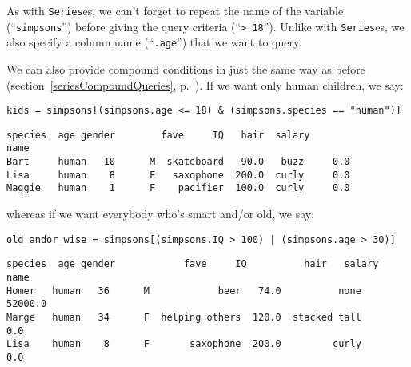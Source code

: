 As with \texttt{Series}es, we can't forget to repeat the name of the variable
(``\texttt{simpsons}'') before giving the query criteria (``\texttt{> 18}'').
Unlike with \texttt{Series}es, we also specify a column name
(``\texttt{.age}'') that we want to query.


We can also provide compound conditions in just the same way as before
(section~\ref{seriesCompoundQueries}, p.~\pageref{seriesCompoundQueries}). If
we want only human children, we say:

\begin{Verbatim}[fontsize=\scriptsize,samepage=true,frame=single,framesep=3mm]
kids = simpsons[(simpsons.age <= 18) & (simpsons.species == "human")]
\end{Verbatim}
\vspace{-.2in}

\begin{Verbatim}[fontsize=\scriptsize,samepage=true,frame=leftline,framesep=5mm,framerule=1mm]
       species  age gender        fave     IQ   hair  salary
name                                                        
Bart     human   10      M  skateboard   90.0   buzz     0.0
Lisa     human    8      F   saxophone  200.0  curly     0.0
Maggie   human    1      F    pacifier  100.0  curly     0.0
\end{Verbatim}

whereas if we want everybody who's smart and/or old, we say:

\begin{Verbatim}[fontsize=\scriptsize,samepage=true,frame=single,framesep=3mm]
old_andor_wise = simpsons[(simpsons.IQ > 100) | (simpsons.age > 30)]
\end{Verbatim}
\vspace{-.2in}

\begin{Verbatim}[fontsize=\scriptsize,samepage=true,frame=leftline,framesep=5mm,framerule=1mm]
      species  age gender            fave     IQ          hair   salary
name                                                                   
Homer   human   36      M            beer   74.0          none  52000.0
Marge   human   34      F  helping others  120.0  stacked tall      0.0
Lisa    human    8      F       saxophone  200.0         curly      0.0
\end{Verbatim}

